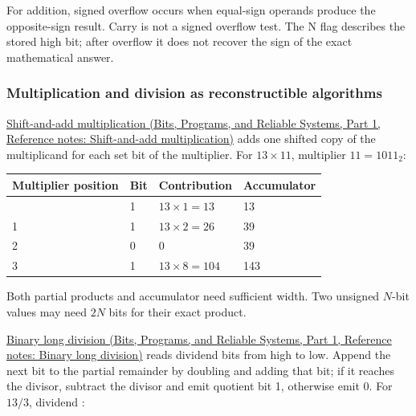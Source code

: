 For addition, signed overflow occurs when equal-sign operands produce the opposite-sign result. Carry is not a signed overflow test. The N flag describes the stored high bit; after overflow it does not recover the sign of the exact mathematical answer.

\subsubsection{Multiplication and division as reconstructible algorithms}\label{05-engine-i-ch001-multiplication-and-division-as-reconstructible-algorithms}

\hypertarget{05-engine-i-ch001-multiplication-and-division-as-reconstructible-algorithms}{}

\href{../01-Bits-Programs-and-Reliable-Systems-P01/main.pdf\#appendix-a65290d66ed9}{Shift-and-add multiplication (Bits, Programs, and Reliable Systems, Part 1, Reference notes: Shift-and-add multiplication)} adds one shifted copy of the multiplicand for each set bit of the multiplier. For \(13\times11\), multiplier \(11=1011_2\):

{\def\LTcaptype{none} %
\begin{longtable}[]{@{}llll@{}}
\toprule\noalign{}
Multiplier position & Bit & Contribution & Accumulator \\
\midrule\noalign{}
\endhead
\bottomrule\noalign{}
\endlastfoot
0 & 1 & \(13\times1=13\) & 13 \\
1 & 1 & \(13\times2=26\) & 39 \\
2 & 0 & 0 & 39 \\
3 & 1 & \(13\times8=104\) & 143 \\
\end{longtable}
}

Both partial products and accumulator need sufficient width. Two unsigned \(N\)-bit values may need \(2N\) bits for their exact product.

\href{../01-Bits-Programs-and-Reliable-Systems-P01/main.pdf\#appendix-89985e6a2685}{Binary long division (Bits, Programs, and Reliable Systems, Part 1, Reference notes: Binary long division)} reads dividend bits from high to low. Append the next bit to the partial remainder by doubling and adding that bit; if it reaches the divisor, subtract the divisor and emit quotient bit 1, otherwise emit 0. For \(13/3\), dividend :

